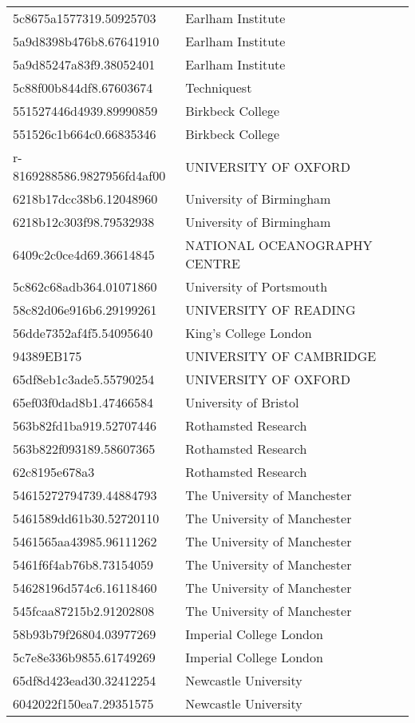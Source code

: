 \begin{tabular}{ll}
5c8675a1577319.50925703 & Earlham Institute \\
5a9d8398b476b8.67641910 & Earlham Institute \\
5a9d85247a83f9.38052401 & Earlham Institute \\
5c88f00b844df8.67603674 & Techniquest \\
551527446d4939.89990859 & Birkbeck College \\
551526c1b664c0.66835346 & Birkbeck College \\
r-8169288586.9827956fd4af00 & UNIVERSITY OF OXFORD \\
6218b17dcc38b6.12048960 & University of Birmingham \\
6218b12c303f98.79532938 & University of Birmingham \\
6409c2c0ce4d69.36614845 & NATIONAL OCEANOGRAPHY CENTRE \\
5c862c68adb364.01071860 & University of Portsmouth \\
58c82d06e916b6.29199261 & UNIVERSITY OF READING \\
56dde7352af4f5.54095640 & King's College London \\
94389EB175 & UNIVERSITY OF CAMBRIDGE \\
65df8eb1c3ade5.55790254 & UNIVERSITY OF OXFORD \\
65ef03f0dad8b1.47466584 & University of Bristol \\
563b82fd1ba919.52707446 & Rothamsted Research \\
563b822f093189.58607365 & Rothamsted Research \\
62c8195e678a3 & Rothamsted Research \\
54615272794739.44884793 & The University of Manchester \\
5461589dd61b30.52720110 & The University of Manchester \\
5461565aa43985.96111262 & The University of Manchester \\
5461f6f4ab76b8.73154059 & The University of Manchester \\
54628196d574c6.16118460 & The University of Manchester \\
545fcaa87215b2.91202808 & The University of Manchester \\
58b93b79f26804.03977269 & Imperial College London \\
5c7e8e336b9855.61749269 & Imperial College London \\
65df8d423ead30.32412254 & Newcastle University \\
6042022f150ea7.29351575 & Newcastle University \\

\end{tabular}
